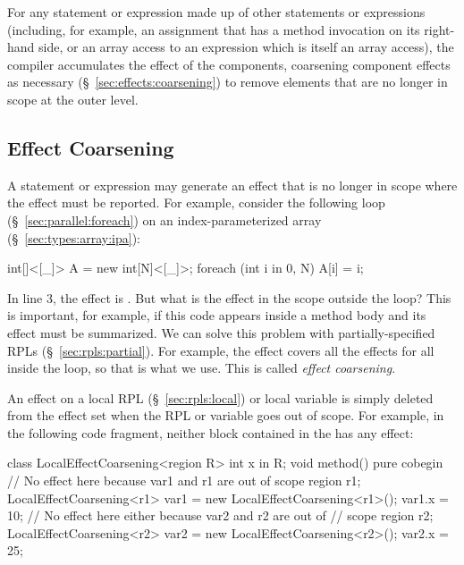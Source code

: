  For any statement or
expression made up of other statements or expressions (including, for
example, an assignment that has a method invocation on its right-hand
side, or an array access to an expression which is itself an array
access), the compiler accumulates the effect of the components,
coarsening component effects as necessary
(\S~\ref{sec:effects:coarsening}) to remove elements that are no
longer in scope at the outer level.



\subsection{Effect Coarsening%
\label{sec:effects:coarsening}}

A statement or expression may generate an effect that is no longer in
scope where the effect must be reported.  For example, consider the
following  loop (\S~\ref{sec:parallel:foreach}) on an
index-parameterized array (\S~\ref{sec:types:array:ipa}):
%
\begin{numbereddpjlisting}
int[]<[_]> A = new int[N]<[_]>;
foreach (int i in 0, N) {
    A[i] = i;
}
\end{numbereddpjlisting}
%
In line 3, the effect is .  But what is the effect in
the scope outside the loop?  This is important, for example, if this
code appears inside a method body and its effect must be summarized.
We can solve this problem with partially-specified RPLs
(\S~\ref{sec:rpls:partial}).  For example, the effect 
covers all the effects  for all  inside the
loop, so that is what we use.  This is called \emph{effect
  coarsening}.

 An effect on a local RPL
(\S~\ref{sec:rpls:local}) or local variable is simply deleted from the
effect set when the RPL or variable goes out of scope.  For example,
in the following code fragment, neither block contained in the
 has any effect:
%
\begin{dpjlisting}
class LocalEffectCoarsening<region R> {
    int x in R;
    void method() pure {
        cobegin {
            // No effect here because var1 and r1 are out of scope
            {
                region r1;
                LocalEffectCoarsening<r1> var1 = 
                    new LocalEffectCoarsening<r1>();
                var1.x = 10;
            }
            // No effect here either because var2 and r2 are out of
            // scope
            {
                region r2;
                LocalEffectCoarsening<r2> var2 =
                    new LocalEffectCoarsening<r2>();
                var2.x = 25;
            }
        }
    }    
}
\end{dpjlisting}

